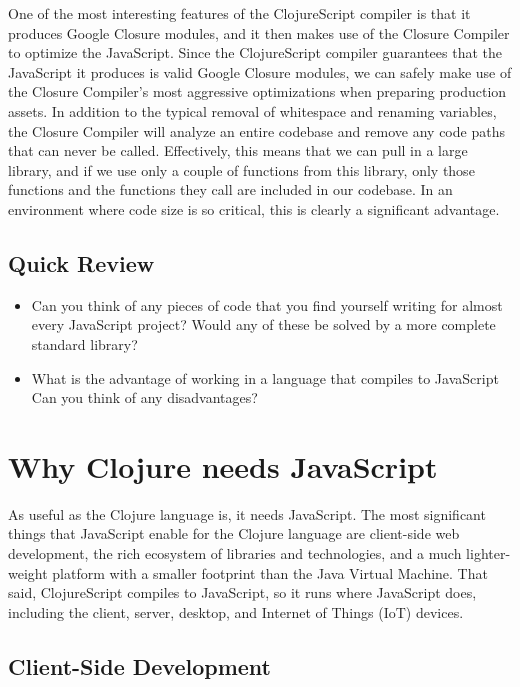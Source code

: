 \documentclass[10pt,twoside,openright]{memoir}
\begin{document}
One of the most interesting features of the ClojureScript compiler is
that it produces Google Closure modules, and it then makes use of the
Closure Compiler to optimize the JavaScript. Since the ClojureScript
compiler guarantees that the JavaScript it produces is valid Google
Closure modules, we can safely make use of the Closure Compiler's most
aggressive optimizations when preparing production assets. In addition
to the typical removal of whitespace and renaming variables, the Closure
Compiler will analyze an entire codebase and remove any code paths that
can never be called. Effectively, this means that we can pull in a large
library, and if we use only a couple of functions from this library,
only those functions and the functions they call are included in our
codebase. In an environment where code size is so critical, this is
clearly a significant advantage.

\subsection{Quick Review}

\begin{itemize}
\tightlist
\item
  Can you think of any pieces of code that you find yourself writing for
  almost every JavaScript project? Would any of these be solved by a
  more complete standard library?
\item
  What is the advantage of working in a language that compiles to
  JavaScript Can you think of any disadvantages?
\end{itemize}

\section{Why Clojure needs JavaScript}

As useful as the Clojure language is, it needs JavaScript. The most
significant things that JavaScript enable for the Clojure language are
client-side web development, the rich ecosystem of libraries and
technologies, and a much lighter-weight platform with a smaller
footprint than the Java Virtual Machine. That said, ClojureScript
compiles to JavaScript, so it runs where JavaScript does, including the
client, server, desktop, and Internet of Things (IoT) devices.

\subsection{Client-Side Development}
\end{document}
